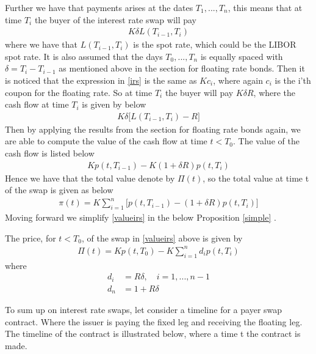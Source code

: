 Further we have that payments
arises at the dates $T_1,...,T_n$, this means that at time $T_i$ the buyer of the interest rate swap will pay
\begin{align}
    K \delta L(T_{i-1},T_i)
    \label{irs}
\end{align}
where we have that $L(T_{i-1},T_i)$ is the spot rate, which could be the LIBOR spot rate.
It is also assumed
that the days $T_0,...,T_n$ is equally spaced with $\delta = T_i - T_{i-1}$ as mentioned above in the section for floating rate bonds. 
Then it is noticed that the expression in \autoref{irs} is the same as $Kc_i$, where again $c_i$ is the i'th coupon for the floating rate. 
So at time $T_i$ the buyer will pay $K \delta R$, where the cash flow at time $T_i$ is given by below
\begin{align*}
    K \delta \Big[L(T_{i-1},T_i)-R \Big]
\end{align*}
Then by applying the results from the section for floating rate bonds again, we are able to compute the value of the 
cash flow at time $t<T_0$. The value of the cash flow is listed below
\begin{align*}
    K p(t,T_{i-1})-K(1+\delta R)p(t,T_i)
\end{align*}
Hence we have that the total value denote by $\Pi(t)$, so the total value at time t of the swap is given as below
\begin{align}
    \pi (t) = K \sum_{i=1}^{n} \Big[p(t,T_{i-1})-(1+ \delta R)p(t,T_i)\Big]
    \label{valueirs}
\end{align}
Moving forward we simplify \autoref{valueirs} in the below Proposition \ref{simple} \cite{Bjork}.
\\
\begin{proposition}
    The price, for $t<T_0$, of the swap in \autoref{valueirs} above
    is given by 
    \begin{align*}
        \Pi(t) = K p(t,T_0)-K \sum_{i=1}^{n}d_i p(t,T_i)
    \end{align*}
    where
    \begin{align*}
        d_i &= R \delta, \quad i=1,...,n-1 \\
        d_n &= 1+ R \delta
    \end{align*}
    \label{simple}
\end{proposition}
\noindent 
To sum up on interest rate swaps, let consider a timeline for a payer swap contract. Where the issuer is paying the fixed leg 
and receiving the floating leg. The timeline of the contract is illustrated below, where a time t the contract is made. 
